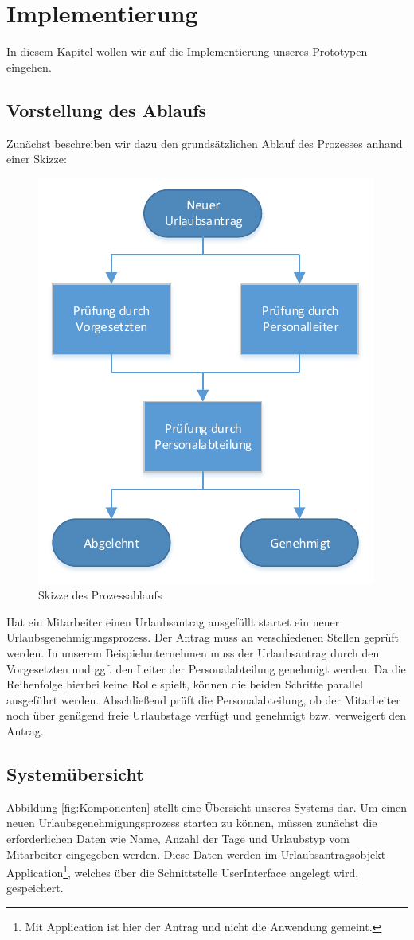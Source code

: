 \newpage
\section{Implementierung}
In diesem Kapitel wollen wir auf die Implementierung unseres Prototypen eingehen.


\subsection{Vorstellung des Ablaufs}
Zunächst beschreiben wir dazu den grundsätzlichen Ablauf des Prozesses anhand einer Skizze:
\begin{figure}[H]
\centering
\includegraphics[width=0.5\linewidth]{Bilder/Workflow}
\caption{Skizze des Prozessablaufs}
\label{fig:Workflow}
\end{figure}

Hat ein Mitarbeiter einen Urlaubsantrag ausgefüllt startet ein neuer Urlaubsgenehmigungsprozess. Der Antrag muss an verschiedenen Stellen geprüft werden. In unserem Beispielunternehmen muss der Urlaubsantrag durch den Vorgesetzten und ggf. den Leiter der Personalabteilung genehmigt werden. Da die Reihenfolge hierbei keine Rolle spielt, können die beiden Schritte parallel ausgeführt werden. Abschließend prüft die Personalabteilung, ob der Mitarbeiter noch über genügend freie Urlaubstage verfügt und genehmigt bzw. verweigert den Antrag.	
	
	
\subsection{Systemübersicht}
Abbildung \ref{fig:Komponenten} stellt eine Übersicht unseres Systems dar. Um einen neuen Urlaubsgenehmigungsprozess starten zu können, müssen zunächst die erforderlichen Daten wie Name, Anzahl der Tage und Urlaubstyp vom Mitarbeiter eingegeben werden. Diese Daten werden im Urlaubsantragsobjekt Application\footnote{Mit Application ist hier der Antrag und nicht die Anwendung gemeint.}, welches über die Schnittstelle UserInterface angelegt wird, gespeichert.

